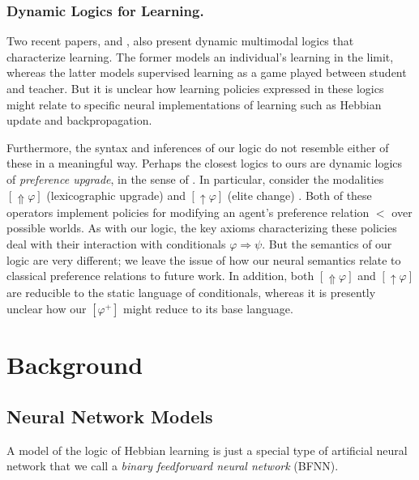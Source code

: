 \documentclass[letterpaper]{article}
\theoremstyle{definition}
\begin{document}
\subsubsection{Dynamic Logics for Learning.}
Two recent papers, \citep{baltag2019dynamic} and \citep{baltag2019right}, also present dynamic multimodal logics that characterize learning.  The former models an individual's learning in the limit, whereas the latter models supervised learning as a game played between student and teacher.  But it is unclear how learning policies expressed in these logics might relate to specific neural implementations of learning such as Hebbian update and backpropagation.

Furthermore, the syntax and inferences of our logic do not resemble either of these in a meaningful way. Perhaps the closest logics to ours are dynamic logics of \emph{preference upgrade}, in the sense of \citep{van2007prefupgrade}.  In particular, consider the modalities $[{\Uparrow} \varphi]$ (lexicographic upgrade) and $[{\uparrow} \varphi]$ (elite change) \citep{van2007beliefrevision}.  Both of these operators implement policies for modifying an agent's preference relation $<$ over possible worlds.  As with our logic, the key axioms characterizing these policies deal with their interaction with conditionals $\varphi \Rightarrow \psi$.  But the semantics of our logic are very different; we leave the issue of how our neural semantics relate to classical preference relations to future work.  In addition, both $[{\Uparrow} \varphi]$ and $[{\uparrow} \varphi]$ are reducible to the static language of conditionals, whereas it is presently unclear how our $[\varphi^+]$ might reduce to its base language.


\section{Background}

\subsection{Neural Network Models}

A model of the logic of Hebbian learning is just a special type of artificial neural network that we call a \emph{binary feedforward neural network} (BFNN).
\end{document}
